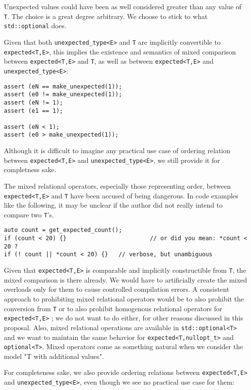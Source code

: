 \documentclass[a4paper,10pt]{article}
\newcommand{\cpp}[1]{\lstinline{#1}}
\begin{document}
Unexpected values could have been as well considered greater than any value of \cpp{T}. The choice is a great degree arbitrary. We choose to stick to what \cpp{std::optional} does.

Given that both \cpp{unexpected_type<E>} and \cpp{T} are implicitly convertible to \cpp{expected<T,E>}, this implies the existence and semantics of mixed comparison between \cpp{expected<T,E>} and \cpp{T}, as well as between \cpp{expected<T,E>} and \cpp{unexpected_type<E>}:

\begin{lstlisting}
assert (eN == make_unexpected(1));
assert (e0 != make_unexpected(1));
assert (eN != 1);
assert (e1 == 1);

assert (eN < 1);
assert (e0 > make_unexpected(1));
\end{lstlisting}

Although it is difficult to imagine any practical use case of ordering relation between \cpp{expected<T,E>} and \cpp{unexpected_type<E>}, we still provide it for completness sake.

The mixed relational operators, especially those representing order, between \cpp{expected<T,E>} and \cpp{T} have been accused of being dangerous. In code examples like the following, it may be unclear if the author did not really intend to compare two \cpp{T}'s.

\begin{lstlisting}
auto count = get_expected_count();
if (count < 20) {}                        // or did you mean: *count < 20 ?
if (! count || *count < 20) {}   // verbose, but unambiguous
\end{lstlisting}

Given that \cpp{expected<T,E>} is comparable and implicitly constructible from \cpp{T}, the mixed comparison is there already. We would have to artificially create the mixed overloads only for them to cause controlled compilation errors. A consistent approach to prohibiting mixed relational operators would be to also prohibit the conversion from \cpp{T} or to also prohibit homogenous relational operators for \cpp{expected<T,E>} ; we do not want to do either, for other reasons discussed in this proposal. Also, mixed relational operations are available in \cpp{std::optional<T>} and we want to maintain the same behavior for \cpp{expected<T,nullopt_t>} and \cpp{optional<T>}. Mixed operators come as something natural when we consider the model "T with additional values".

For completeness sake, we also provide ordering relations between  \cpp{expected<T,E>} and  \cpp{unexpected_type<E>}, even though we see no practical use case for them:
\end{document}
